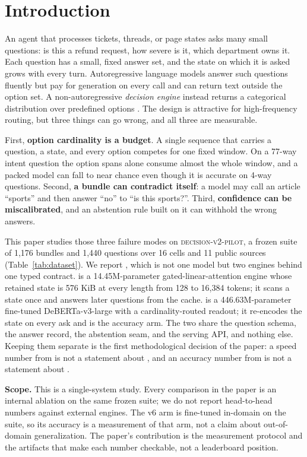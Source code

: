 \section{Introduction}
\label{sec:intro}

An agent that processes tickets, threads, or page states asks many small questions: is this a refund request, how severe is it, which department owns it. Each question has a small, fixed answer set, and the state on which it is asked grows with every turn. Autoregressive language models answer such questions fluently but pay for generation on every call and can return text outside the option set. A non-autoregressive \emph{decision engine} instead returns a categorical distribution over predefined options \cite{li2026jev,duan2026gdm}. The design is attractive for high-frequency routing, but three things can go wrong, and all three are measurable.

First, \textbf{option cardinality is a budget}. A single sequence that carries a question, a state, and every option competes for one fixed window. On a 77-way intent question the option spans alone consume almost the whole window, and a packed model can fall to near chance even though it is accurate on 4-way questions. Second, \textbf{a bundle can contradict itself}: a model may call an article “sports” and then answer “no” to “is this sports?”. Third, \textbf{confidence can be miscalibrated}, and an abstention rule built on it can withhold the wrong answers.

This paper studies those three failure modes on \textsc{decision-v2-pilot}, a frozen suite of 1{,}176 bundles and 1{,}440 questions over 16 cells and 11 public sources (Table~\ref{tab:dataset}). We report \myna, which is not one model but two engines behind one typed contract. \stream{} is a 14.45M-parameter gated-linear-attention engine whose retained state is 576 KiB at every length from 128 to 16{,}384 tokens; it scans a state once and answers later questions from the cache. \vsix{} is a 446.63M-parameter fine-tuned DeBERTa-v3-large with a cardinality-routed readout; it re-encodes the state on every ask and is the accuracy arm. The two share the question schema, the answer record, the abstention seam, and the serving API, and nothing else. Keeping them separate is the first methodological decision of the paper: a speed number from \stream{} is not a statement about \vsix{}, and an accuracy number from \vsix{} is not a statement about \stream{}.

\textbf{Scope.} This is a single-system study. Every comparison in the paper is an internal ablation on the same frozen suite; we do not report head-to-head numbers against external engines. The v6 arm is fine-tuned in-domain on the suite, so its accuracy is a measurement of that arm, not a claim about out-of-domain generalization. The paper's contribution is the measurement protocol and the artifacts that make each number checkable, not a leaderboard position.

